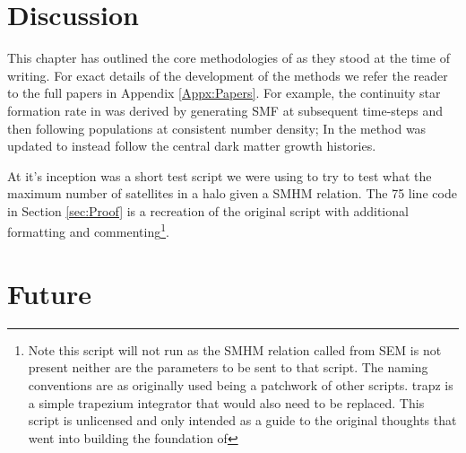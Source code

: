 \section{Discussion}

This chapter has outlined the core methodologies of \steel as they stood at the time of writing. For exact details of the development of the methods we refer the reader to the full papers in Appendix \ref{Appx:Papers}. For example, the continuity star formation rate in  was derived by generating SMF at subsequent time-steps and then following populations at consistent number density; In  the method was updated to instead follow the central dark matter growth histories. 

At it's inception \steel was a short test script we were using to try to test what the maximum number of satellites in a halo given a SMHM relation. The 75 line code in Section \ref{sec:Proof} is a recreation of the original script with additional formatting and commenting\footnote{Note this script will not run as the SMHM relation called from SEM is not present neither are the parameters to be sent to that script. The naming conventions are as originally used being a patchwork of other scripts. trapz is a simple trapezium integrator that would also need to be replaced. This script is unlicensed and only intended as a guide to the original thoughts that went into building the foundation of \steel}.

\section{Future}

